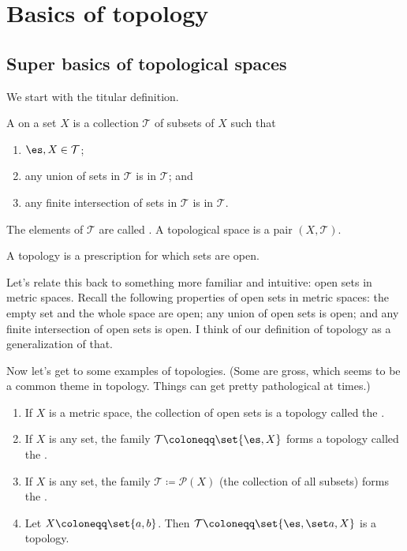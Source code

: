 \documentclass[class=article, crop=false]{standalone}
\begin{document}
\section{Basics of topology}

\subsection{Super basics of topological spaces}

We start with the titular definition.
\begin{defn}[Topology]
  A  on a set $X$ is a collection $\mathcal T$ of subsets of $X$ such that
    \begin{enumerate}[(1)]
      \item $\es, X \in \mathcal T$;
      \item any union of sets in $\mathcal T$ is in $\mathcal T$; and
      \item any finite intersection of sets in $\mathcal T$ is in $\mathcal T$.
    \end{enumerate}
  The elements of $\mathcal T$ are called . A topological space is a pair $(X,\mathcal T)$.
\end{defn}
\begin{rem}
  A topology is a prescription for which sets are open.
\end{rem}

Let's relate this back to something more familiar and intuitive: open sets in metric spaces. Recall the following properties of open sets in metric spaces: the empty set and the whole space are open; any union of open sets is open; and any finite intersection of open sets is open. I think of our definition of topology as a generalization of that.

Now let's get to some examples of topologies. (Some are gross, which seems to be a common theme in topology. Things can get pretty pathological at times.)

\begin{ex} \ldr
  \begin{enumerate}[(1)]
    \item If $X$ is a metric space, the collection of open sets is a topology called the .

    \item If $X$ is any set, the family $\mathcal T \coloneqq \set{\es, X}$ forms a topology called the .

    \item If $X$ is any set, the family $\mathcal T \coloneqq \mathcal P (X)$ (the collection of all subsets) forms the .

    \item Let $X \coloneqq \set{a,b}$. Then $\mathcal T \coloneqq \set{\es, \set a, X}$ is a topology.
  \end{enumerate}
\end{ex}
\end{document}
